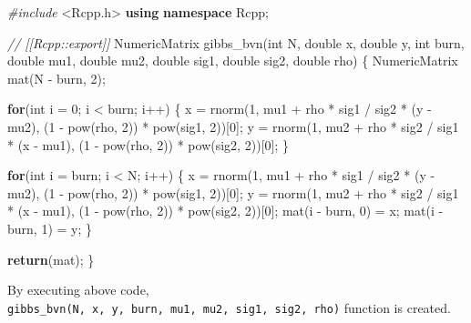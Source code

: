 \documentclass[]{book}
\newenvironment{Shaded}{\begin{snugshade}}{\end{snugshade}}
\newcommand{\CommentTok}[1]{\textcolor[rgb]{0.56,0.35,0.01}{\textit{#1}}}
\newcommand{\ControlFlowTok}[1]{\textcolor[rgb]{0.13,0.29,0.53}{\textbf{#1}}}
\newcommand{\DataTypeTok}[1]{\textcolor[rgb]{0.13,0.29,0.53}{#1}}
\newcommand{\DecValTok}[1]{\textcolor[rgb]{0.00,0.00,0.81}{#1}}
\newcommand{\FloatTok}[1]{\textcolor[rgb]{0.00,0.00,0.81}{#1}}
\newcommand{\ImportTok}[1]{#1}
\newcommand{\KeywordTok}[1]{\textcolor[rgb]{0.13,0.29,0.53}{\textbf{#1}}}
\newcommand{\NormalTok}[1]{#1}
\newcommand{\OperatorTok}[1]{\textcolor[rgb]{0.81,0.36,0.00}{\textbf{#1}}}
\newcommand{\PreprocessorTok}[1]{\textcolor[rgb]{0.56,0.35,0.01}{\textit{#1}}}
\newcommand{\StringTok}[1]{\textcolor[rgb]{0.31,0.60,0.02}{#1}}
\theoremstyle{definition}
\theoremstyle{definition}
\theoremstyle{definition}
\theoremstyle{remark}
\begin{document}
\begin{Shaded}
\begin{Highlighting}[]
\PreprocessorTok{#include }\ImportTok{<Rcpp.h>}
\KeywordTok{using} \KeywordTok{namespace}\NormalTok{ Rcpp;}

\CommentTok{// [[Rcpp::export]]}
\NormalTok{NumericMatrix gibbs_bvn(}\DataTypeTok{int}\NormalTok{ N, }\DataTypeTok{double}\NormalTok{ x, }\DataTypeTok{double}\NormalTok{ y, }\DataTypeTok{int}\NormalTok{ burn, }
                        \DataTypeTok{double}\NormalTok{ mu1, }\DataTypeTok{double}\NormalTok{ mu2, }\DataTypeTok{double}\NormalTok{ sig1, }\DataTypeTok{double}\NormalTok{ sig2, }\DataTypeTok{double}\NormalTok{ rho) \{}
\NormalTok{  NumericMatrix mat(N - burn, }\DecValTok{2}\NormalTok{);}
  
  \ControlFlowTok{for}\NormalTok{(}\DataTypeTok{int}\NormalTok{ i = }\DecValTok{0}\NormalTok{; i < burn; i++) \{}
\NormalTok{    x = rnorm(}\DecValTok{1}\NormalTok{, mu1 + rho * sig1 / sig2 * (y - mu2), (}\DecValTok{1}\NormalTok{ - pow(rho, }\DecValTok{2}\NormalTok{)) * pow(sig1, }\DecValTok{2}\NormalTok{))[}\DecValTok{0}\NormalTok{];}
\NormalTok{    y = rnorm(}\DecValTok{1}\NormalTok{, mu2 + rho * sig2 / sig1 * (x - mu1), (}\DecValTok{1}\NormalTok{ - pow(rho, }\DecValTok{2}\NormalTok{)) * pow(sig2, }\DecValTok{2}\NormalTok{))[}\DecValTok{0}\NormalTok{];}
\NormalTok{  \}}
  
  \ControlFlowTok{for}\NormalTok{(}\DataTypeTok{int}\NormalTok{ i = burn; i < N; i++) \{}
\NormalTok{    x = rnorm(}\DecValTok{1}\NormalTok{, mu1 + rho * sig1 / sig2 * (y - mu2), (}\DecValTok{1}\NormalTok{ - pow(rho, }\DecValTok{2}\NormalTok{)) * pow(sig1, }\DecValTok{2}\NormalTok{))[}\DecValTok{0}\NormalTok{];}
\NormalTok{    y = rnorm(}\DecValTok{1}\NormalTok{, mu2 + rho * sig2 / sig1 * (x - mu1), (}\DecValTok{1}\NormalTok{ - pow(rho, }\DecValTok{2}\NormalTok{)) * pow(sig2, }\DecValTok{2}\NormalTok{))[}\DecValTok{0}\NormalTok{];}
\NormalTok{    mat(i - burn, }\DecValTok{0}\NormalTok{) = x;}
\NormalTok{    mat(i - burn, }\DecValTok{1}\NormalTok{) = y;}
\NormalTok{  \}}
  
  \ControlFlowTok{return}\NormalTok{(mat);}
\NormalTok{\}}
\end{Highlighting}
\end{Shaded}

By executing above code, \texttt{gibbs\_bvn(N,\ x,\ y,\ burn,\ mu1,\ mu2,\ sig1,\ sig2,\ rho)} function is created.

\begin{Shaded}
\end{Shaded}
\end{document}
